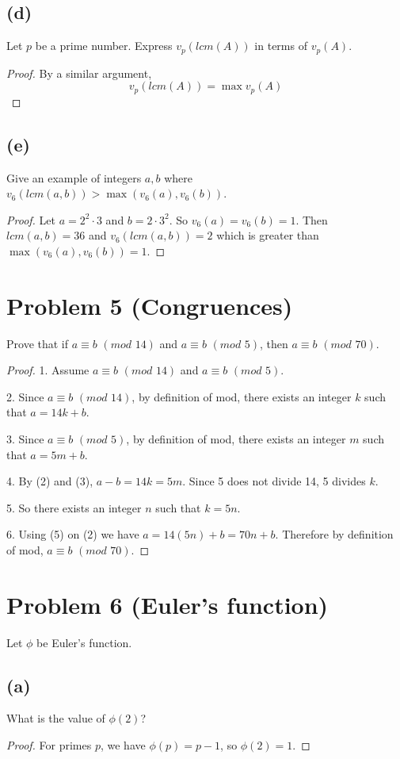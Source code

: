 \documentclass[14pt]{extarticle}
\begin{document}
\subsection{(d)} 
Let $p$ be a prime number. Express $v_p(lcm(A))$ in terms of $v_p(A)$.
\begin{proof}
By a similar argument,
$$
v_p(lcm(A)) = \max v_p(A)
$$
\end{proof}

\subsection{(e)} 
Give an example of integers $a, b$ where $v_6(lcm(a, b)) > \max(v_6(a), v_6(b))$.
\begin{proof}
Let $a = 2^2 \cdot 3$ and $b = 2 \cdot 3^2$. So $v_6(a) = v_6(b) = 1$. Then $lcm(a,b) = 36$ and $v_6(lcm(a,b)) = 2$ which is greater than $\max(v_6(a), v_6(b)) = 1$.
\end{proof}

\section{Problem 5 (Congruences)}
Prove that if $a \equiv b \,\,(mod \,\,14)$ and $a \equiv b \,\,(mod\,\, 5)$, then $a \equiv b \,\,(mod\,\, 70)$.
\begin{proof}
1. Assume $a \equiv b \,\,(mod \,\,14)$ and $a \equiv b \,\,(mod\,\, 5)$.

2. Since $a \equiv b \,\,(mod \,\,14)$, by definition of mod, there exists an integer $k$ such that $a = 14k + b$.

3. Since $a \equiv b \,\,(mod \,\,5)$, by definition of mod, there exists an integer $m$ such that $a = 5m + b$.

4. By (2) and (3), $a - b = 14k = 5m$. Since 5 does not divide 14, 5 divides $k$.

5. So there exists an integer $n$ such that $k = 5n$.

6. Using (5) on (2) we have $a = 14(5n) + b = 70n + b$. Therefore by definition of mod, $a \equiv b \,\,(mod\,\, 70)$.
\end{proof}

\section{Problem 6 (Euler's function)}
Let $\phi$ be Euler’s function.
\subsection{(a)}
What is the value of $\phi(2)$?
\begin{proof}
For primes $p$, we have $\phi(p) = p-1$, so $\phi(2) = 1$.
\end{proof}
\end{document}
